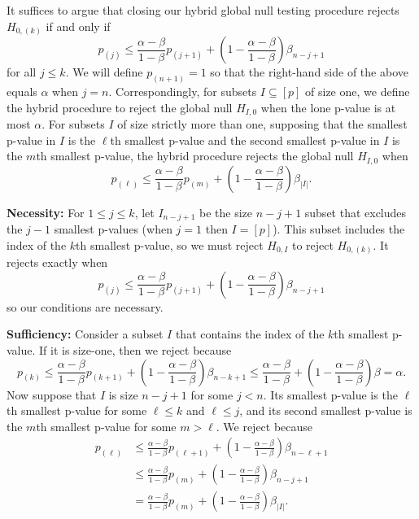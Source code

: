 \documentclass{article}
\begin{document}
\begin{appendix}
It suffices to argue that closing our hybrid global null testing procedure rejects $H_{0, (k)}$ if and only if 
\begin{equation*}
p_{(j)} \leq \frac{\alpha - \beta}{1-\beta} p_{(j + 1)} + \left(1 - \frac{\alpha - \beta}{1-\beta} \right)\beta_{n - j + 1} 
\end{equation*}
for all $j \leq k$. We will define $p_{(n+1)} = 1$ so that the right-hand side of the above equals $\alpha$ when $j = n$. Correspondingly, for subsets $I \subseteq [p]$ of size one, we define the hybrid procedure to reject the global null $H_{I, 0}$ when the lone p-value is at most $\alpha$. For subsets $I$ of size strictly more than one, supposing that the smallest p-value in $I$ is the $\ell$th smallest p-value and the second smallest p-value in $I$ is the $m$th smallest p-value, the hybrid procedure rejects the global null $H_{I, 0}$ when
\begin{equation*}
    p_{(\ell)} \leq \frac{\alpha-\beta}{1-\beta} p_{(m)} + \left(1 - \frac{\alpha - \beta}{1-\beta} \right)\beta_{|I|}.
\end{equation*}

\noindent \textbf{Necessity: } For $1 \leq j \leq k$, let $I_{n-j + 1}$ be the size $n - j + 1$ subset that excludes the $j - 1$ smallest p-values (when $j = 1$ then $I = [p]$). This subset includes the index of the $k$th smallest p-value, so we must reject $H_{0, I}$ to reject $H_{0, (k)}$. It rejects exactly when
\begin{equation*}
    p_{(j)} \leq \frac{\alpha - \beta}{1-\beta} p_{(j + 1)} + \left(1 - \frac{\alpha - \beta}{1-\beta} \right)\beta_{n - j + 1}
\end{equation*}
so our conditions are necessary. \newline 

\noindent \textbf{Sufficiency: } Consider a subset $I$ that contains the index of the $k$th smallest p-value. If it is size-one, then we reject because 
\begin{equation*}
    p_{(k)} \leq \frac{\alpha - \beta}{1-\beta}p_{(k + 1)} + \left(1 - \frac{\alpha - \beta}{1-\beta} \right) \beta_{n - k + 1} \leq \frac{\alpha - \beta}{1-\beta} + \left(1 - \frac{\alpha - \beta}{1-\beta} \right)\beta = \alpha. 
\end{equation*}
Now suppose that $I$ is size $n-j+1$ for some $j < n$.  Its smallest p-value is the $\ell$th smallest p-value for some $\ell \leq k$ and $\ell \leq j$, and its second smallest p-value is the $m$th smallest p-value for some $m > \ell$. We reject because 
\begin{align*}
    p_{(\ell)} &\leq \frac{\alpha-\beta}{1-\beta} p_{(\ell + 1)} + \left(1 - \frac{\alpha - \beta}{1-\beta} \right)\beta_{ n - \ell + 1}\\
    &\leq \frac{\alpha-\beta}{1-\beta} p_{(m)} + \left(1 - \frac{\alpha - \beta}{1-\beta} \right)\beta_{ n - j + 1} \\
    &= \frac{\alpha-\beta}{1-\beta} p_{(m)} + \left(1 - \frac{\alpha - \beta}{1-\beta} \right)\beta_{|I|}.
\end{align*}


\end{appendix}
\end{document}
